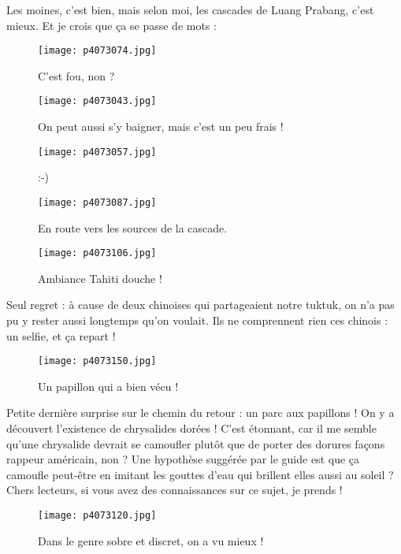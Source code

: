 \documentclass{book}
\begin{document}
Les moines, c'est bien, mais selon moi, les cascades de Luang Prabang, c'est mieux. Et je crois que ça se passe de mots :


\begin{figure}[h]
\centering
\texttt{[image: p4073074.jpg]}
\caption*{C'est fou, non ?}
\end{figure}


\begin{figure}[h]
\centering
\texttt{[image: p4073043.jpg]}
\caption*{On peut aussi s'y baigner, mais c'est un peu frais !}
\end{figure}


\begin{figure}[h]
\centering
\texttt{[image: p4073057.jpg]}
\caption*{:-)}
\end{figure}


\begin{figure}[h]
\centering
\texttt{[image: p4073087.jpg]}
\caption*{En route vers les sources de la cascade.}
\end{figure}


\begin{figure}[h]
\centering
\texttt{[image: p4073106.jpg]}
\caption*{Ambiance Tahiti douche !}
\end{figure}

Seul regret : à cause de deux chinoises qui partageaient notre tuktuk, on n'a pas pu y rester aussi longtemps qu'on voulait. Ils ne comprennent rien ces chinois : un selfie, et ça repart !


\begin{figure}[h]
\centering
\texttt{[image: p4073150.jpg]}
\caption*{Un papillon qui a bien vécu !}
\end{figure}

Petite dernière surprise sur le chemin du retour : un parc aux papillons ! On y a découvert l'existence de chrysalides dorées ! C'est étonnant, car il me semble qu'une chrysalide devrait se camoufler plutôt que de porter des dorures façons rappeur américain, non ? Une hypothèse suggérée par le guide est que ça camoufle peut-être en imitant les gouttes d'eau qui brillent elles aussi au soleil ? Chers lecteurs, si vous avez des connaissances sur ce sujet, je prends !


\begin{figure}[h]
\centering
\texttt{[image: p4073120.jpg]}
\caption*{Dans le genre sobre et discret, on a vu mieux !}
\end{figure}
\end{document}
